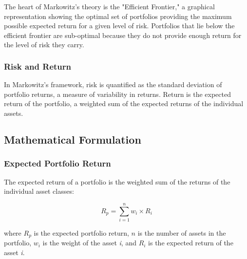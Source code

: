\documentclass{article}
\begin{document}
The heart of Markowitz's theory is the "Efficient Frontier," a graphical representation showing the optimal set of portfolios providing the maximum possible expected return for a given level of risk. Portfolios that lie below the efficient frontier are sub-optimal because they do not provide enough return for the level of risk they carry.

\subsubsection*{Risk and Return}

In Markowitz's framework, risk is quantified as the standard deviation of portfolio returns, a measure of variability in returns. Return is the expected return of the portfolio, a weighted sum of the expected returns of the individual assets.

\subsection{Mathematical Formulation}

\subsubsection*{Expected Portfolio Return}

The expected return of a portfolio is the weighted sum of the returns of the individual asset classes:

\begin{equation}
R_p = \sum_{i=1}^{n} w_i \times R_i
\end{equation}

where \( R_p \) is the expected portfolio return, \( n \) is the number of assets in the portfolio, \( w_i \) is the weight of the asset \textit{i}, and \( R_i \) is the expected return of the asset \textit{i}.
\end{document}
